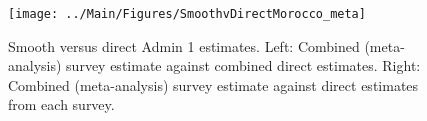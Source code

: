 \documentclass[12pt]{article}\usepackage[]{graphicx}\usepackage[]{color}
\newenvironment{knitrout}{}{} %
\begin{document}



\begin{knitrout}
\color{fgcolor}\begin{figure}[bht]

{\centering \texttt{[image: ../Main/Figures/SmoothvDirectMorocco\_meta]} 

}

\caption[Smooth versus direct Admin 1 estimates]{Smooth versus direct Admin 1 estimates. Left: Combined (meta-analysis) survey estimate against combined direct estimates. Right: Combined (meta-analysis) survey estimate against direct estimates from each survey.}\label{fig:unnamed-chunk-223}
\end{figure}


\end{knitrout}
\end{document}
